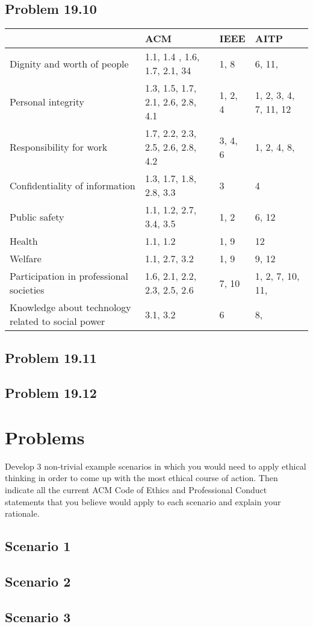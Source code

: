 \documentclass[14pt]{article}
\begin{document}
\subsection{Problem 19.10}
\begin{table}[]
  \begin{tabular}{|l|lll}
    \hline
     & ACM & IEEE & AITP \\ \hline
    Dignity and worth of people & 1.1, 1.4 , 1.6, 1.7, 2.1, 34 & 1, 8 & 6, 11, \\ \cline{1-1}
    Personal integrity & 1.3, 1.5, 1.7, 2.1, 2.6, 2.8, 4.1 & 1, 2, 4 & 1, 2, 3, 4, 7, 11, 12 \\ \cline{1-1}
    Responsibility for work & 1.7, 2.2, 2.3, 2.5, 2.6, 2.8, 4.2 & 3, 4, 6 & 1, 2, 4, 8, \\ \cline{1-1}
    Confidentiality of information & 1.3, 1.7, 1.8, 2.8, 3.3 & 3 & 4 \\ \cline{1-1}
    Public safety & 1.1, 1.2, 2.7, 3.4, 3.5 & 1, 2 & 6, 12 \\ \cline{1-1}
    Health & 1.1, 1.2 & 1, 9 & 12 \\ \cline{1-1}
    Welfare & 1.1, 2.7, 3.2 & 1, 9 & 9, 12 \\ \cline{1-1}
    Participation in professional societies & 1.6, 2.1, 2.2, 2.3, 2.5, 2.6 & 7, 10 & 1, 2, 7, 10, 11, \\ \cline{1-1}
    Knowledge about technology related to social power & 3.1, 3.2 & 6 & 8, \\ \cline{1-1}
  \end{tabular}
\end{table}
\newpage
\subsection{Problem 19.11}

\newpage
\subsection{Problem 19.12}

\newpage

\section{Problems}
Develop 3 non-trivial example scenarios in which you would need to apply ethical thinking in order to come up with the most ethical course of action. Then indicate all the current ACM Code of Ethics and Professional Conduct statements that you believe would apply to each scenario and explain your rationale.
\subsection{Scenario 1}

\newpage
\subsection{Scenario 2}

\newpage
\subsection{Scenario 3}


\newpage


\end{document}
